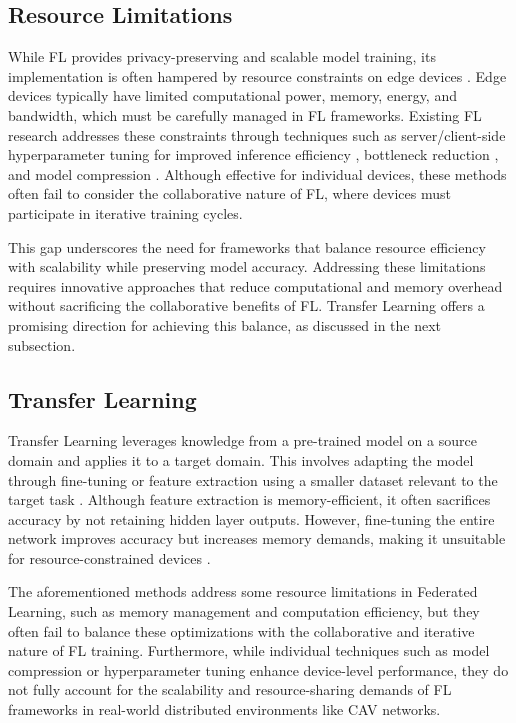 \subsection{Resource Limitations}
While FL provides privacy-preserving and scalable model training, its implementation is often hampered by resource constraints on edge devices \cite{bonawitz2019towards}. Edge devices typically have limited computational power, memory, energy, and bandwidth,  which must be carefully managed in FL frameworks. Existing FL research addresses these constraints through techniques such as server/client-side hyperparameter tuning for improved inference efficiency \cite{cai2019once, kumar2017resource}, bottleneck reduction \cite{ashraf2020novel}, and model compression \cite{aleesa2020review}. Although effective for individual devices, these methods often fail to consider the collaborative nature of FL, where devices must participate in iterative training cycles.

This gap underscores the need for frameworks that balance resource efficiency with scalability while preserving model accuracy. Addressing these limitations requires innovative approaches that reduce computational and memory overhead without sacrificing the collaborative benefits of FL. Transfer Learning offers a promising direction for achieving this balance, as discussed in the next subsection.

\subsection{Transfer Learning}
Transfer Learning leverages knowledge from a pre-trained model on a source domain and applies it to a target domain. This involves adapting the model through fine-tuning or feature extraction using a smaller dataset relevant to the target task \cite{iman2023review, shin2016deep}. Although feature extraction is memory-efficient, it often sacrifices accuracy by not retaining hidden layer outputs. However, fine-tuning the entire network improves accuracy but increases memory demands, making it unsuitable for resource-constrained devices \cite{cai2020tinytl}.

The aforementioned methods address some resource limitations in Federated Learning, such as memory management and computation efficiency, but they often fail to balance these optimizations with the collaborative and iterative nature of FL training. Furthermore, while individual techniques such as model compression or hyperparameter tuning enhance device-level performance, they do not fully account for the scalability and resource-sharing demands of FL frameworks in real-world distributed environments like CAV networks.
